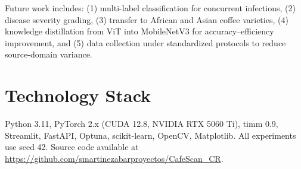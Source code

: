 \documentclass[conference]{IEEEtran}
\begin{document}
Future work includes: (1) multi-label classification for concurrent
infections, (2) disease severity grading, (3) transfer to African and
Asian coffee varieties, (4) knowledge distillation from ViT into
MobileNetV3 for accuracy--efficiency improvement, and (5) data collection
under standardized protocols to reduce source-domain variance.

\section*{Technology Stack}

Python 3.11, PyTorch 2.x (CUDA 12.8, NVIDIA RTX 5060 Ti), timm 0.9,
Streamlit, FastAPI, Optuna, scikit-learn, OpenCV, Matplotlib.
All experiments use seed 42. Source code available at
\url{https://github.com/smartinezabarproyectos/CafeScan_CR}.

\balance


\end{document}
